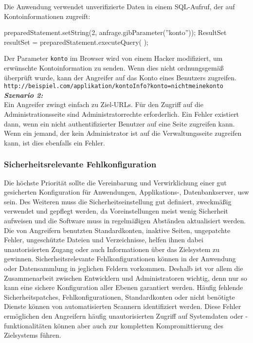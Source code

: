 Die Anwendung verwendet unverifizierte Daten in einem SQL-Aufruf, der auf Kontoinformationen zugreift\cite{owasp13top10}:

\begin{LaTeXCode}[caption={Broken Access Control - Beispiel 1},captionpos=b, label=LaTeXCode:bac1][numbers=none]
preparedStatement.setString(2, anfrage.gibParameter(''konto''));
ResultSet resultSet = preparedStatement.executeQuery( );
\end{LaTeXCode}

Der Parameter \texttt{konto} im Browser wird von einem Hacker modifiziert, um erwünschte Kontoinformation zu senden. Wenn dies nicht ordnungsgemäß überprüft wurde, kann der Angreifer auf das Konto eines Benutzers zugreifen.\\

\texttt{http://beispiel.com/applikation/kontoInfo?konto=nichtmeinekonto}\\

\textbf{\textit{Szenario 2:}}\\

Ein Angreifer zwingt einfach zu Ziel-URLs. Für den Zugriff auf die Administrationsseite sind Administratorrechte erforderlich. Ein Fehler existiert dann, wenn ein nicht authentifizierter Benutzer auf eine Seite zugreifen kann. Wenn ein jemand, der kein Administrator ist auf die Verwaltungsseite zugreifen kann, ist dies ebenfalls ein Fehler\cite[11]{owasp17top10}.\\

\subsubsection{Sicherheitsrelevante Fehlkonfiguration}

Die höchste Priorität sollte die Vereinbarung und Verwirklichung einer gut gesicherten Konfiguration für Anwendungen, Applikations-, Datenbankserver, usw sein. Des Weiteren muss die Sicherheitseinstellung gut definiert, zweckmäßig verwendet und gepflegt werden, da Voreinstellungen meist wenig Sicherheit aufweisen und die Software muss in regelmäßigen Abständen aktualisiert werden. Die von Angreifern benutzten Standardkonten, inaktive Seiten, ungepatchte Fehler, ungeschützte Dateien und Verzeichnisse, helfen ihnen dabei unautorisierten Zugang oder auch Informationen über das Zielsystem zu gewinnen. Sicherheitsrelevante Fehlkonfigurationen können in der Anwendung oder Datensammlung in jeglichen Feldern vorkommen. Deshalb ist vor allem die Zusammenarbeit zwischen Entwicklern und Administratoren wichtig, denn nur so kann eine sichere Konfiguration aller Ebenen garantiert werden. Häufig fehlende Sicherheitspatches,
Fehlkonfigurationen, Standardkonten oder nicht benötigte Dienste können von automatisierten Scannern identifiziert werden. Diese Fehler ermöglichen den Angreifern häufig unautorisierten Zugriff auf Systemdaten oder -funktionalitäten können aber auch zur kompletten Kompromittierung des Zielsystems führen\cite{owasp13top10}.\\

